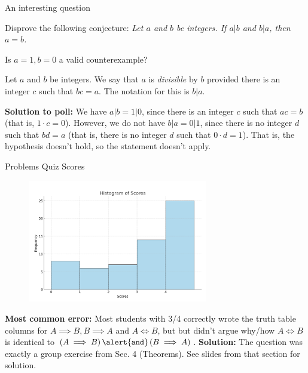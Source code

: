 \documentclass[10pt]{beamer}
\begin{document}
\begin{frame}{An interesting question}

 \begin{mygreenbox}[title=Reading Quiz (Sec. 6 - Counterexamples)]
Disprove the following conjecture:  
\textit{Let $a$ and $b$ be integers.  If $a|b$ and $b|a$, then $a=b$.}  
\end{mygreenbox}
\vfill 
\begin{myyellowbox}[title=Poll]
Is $a=1, b=0$ a valid counterexample?
\end{myyellowbox}
\vfill 
\pause 
	\begin{mydef}[title=Reminder of Definition 3.2 (\textbf{Divisible})]
	Let $a$ and $b$ be integers.  We say that $a$ is \textit{divisible} by $b$ provided there is an integer $c$ such that $bc=a$. The notation for this is $b|a$. 
	\end{mydef}
\vfill 	
\pause 
\footnotesize 
\textbf{Solution to poll:} We have $a|b = 1|0$, since there is an integer $c$ such that $ac=b$ (that is, $1 \cdot c =0$). However, we do not have $b|a=0|1$, since there is no integer $d$ such that $bd=a$ (that is, there is no integer $d$ such that  $0 \cdot d = 1$). That is, the hypothesis doesn't hold, so the statement doesn't apply.  
\end{frame}






\begin{frame}{Problems Quiz Scores}

\begin{figure}[ht]
    \centering
        \includegraphics[width=0.7\textwidth]{images/problems_quiz_2025_01_24}
\end{figure}
\vfill 
\textbf{Most common error:} Most students with 3/4  correctly wrote the truth table columns for $A \implies B, B \implies A$ and $A \iff B$, but   but didn't argue why/how $A \iff B$ is identical to $(A \implies B) \, \alert{\texttt{and}} \, (B \implies A)$.  
\vfill 
\textbf{Solution:} The question was exactly a group exercise from Sec. 4 (Theorems).   See slides from that section for solution.
\end{frame}
\end{document}
